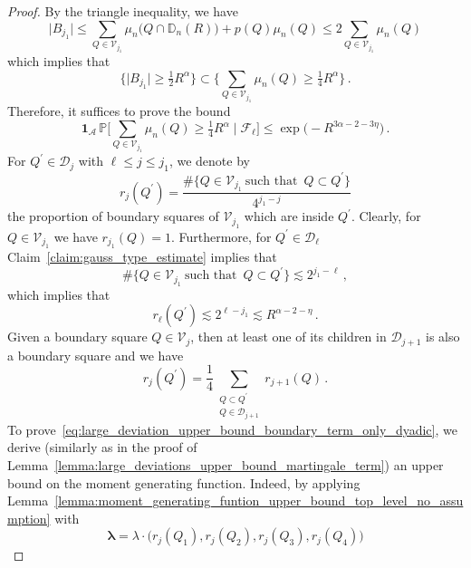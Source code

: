 \documentclass[11pt]{amsart}
\theoremstyle{definition}
\theoremstyle{remark}
\numberwithin{equation}{section}
\def\la{{\lambda}}
\newcommand{\bD}{\mathbb D}
\newcommand{\bP}{\mathbb P}
\begin{document}
	\begin{proof}
		By the triangle inequality, we have
		\[
		\big| B_{j_1} \big| \le \sum_{Q\in \mathcal{V}_{j_1}} \mu_n\big(Q\cap \bD_n(R)\big) + p(Q) \mu_n(Q) \le 2 \sum_{Q\in \mathcal{V}_{j_1}} \mu_n(Q)
		\]
		which implies that 
		\[
		\Big\{\big| B_{j_1} \big| \ge \tfrac{1}{2} R^{\alpha} \Big\} \subset \Big\{\sum_{Q\in \mathcal{V}_{j_1}} \mu_n(Q) \ge \tfrac{1}{4} R^\alpha \Big\} \, .
		\]
		Therefore, it suffices to prove the bound
		\begin{equation}
			\label{eq:large_deviation_upper_bound_boundary_term_only_dyadic}
			\mathbf{1}_{\mathcal{A}} \, \bP\Big[\sum_{Q\in \mathcal{V}_{j_1}} \mu_n(Q) \ge \tfrac{1}{4} R^\alpha \mid \mathcal{F}_\ell\Big] \le \exp\Big(-R^{3\alpha -2 - 3\eta}\Big) \, .
		\end{equation}
		For $Q^\prime\in \mathcal{D}_j$ with $\ell \le j \le j_1$, we denote by
		\begin{equation*}
			r_{j}(Q^\prime) = \frac{\#\big\{Q\in \mathcal{V}_{j_1} \ \text{such that } \, Q\subset Q^\prime\big\}}{4^{j_1-j}}
		\end{equation*}
		the proportion of boundary squares of $\mathcal{V}_{j_1}$ which are inside $Q^\prime$. Clearly, for $Q\in \mathcal{V}_{j_1}$ we have $r_{j_1}(Q) = 1$. Furthermore, for $Q^\prime\in \mathcal{D}_\ell$ Claim~\ref{claim:gauss_type_estimate} implies that
		\[
		\#\big\{Q\in \mathcal{V}_{j_1} \ \text{such that } \, Q\subset Q^\prime\big\} \lesssim 2^{j_1-\ell} \, ,
		\]
		which implies that
		\begin{equation}
			\label{eq:bound_on_r_ell_Q}
			r_{\ell}(Q^\prime) \lesssim 2^{\ell - j_1} \lesssim R^{\alpha-2-\eta} \, .
		\end{equation}
		Given a boundary square $Q\in \mathcal{V}_j$, then at least one of its children in $\mathcal{D}_{j+1}$ is also a boundary square and we have
		\begin{equation}
			\label{eq:average_of_proportions_is_proportion_of_top}
			r_j(Q^\prime) = \frac{1}{4} \sum_{\substack{Q\subset Q^\prime \\ Q\in \mathcal{D}_{j+1}}} r_{j+1}(Q) \, .
		\end{equation} 
		To prove~\eqref{eq:large_deviation_upper_bound_boundary_term_only_dyadic}, we derive (similarly as in the proof of Lemma~\ref{lemma:large_deviations_upper_bound_martingale_term}) an upper bound on the moment generating function. Indeed, by applying Lemma~\ref{lemma:moment_generating_funtion_upper_bound_top_level_no_assumption} with
		\[
		\boldsymbol{\la} = \la \cdot \big(r_{j}(Q_1), r_j(Q_2), r_j(Q_3), r_j(Q_4)\big) 
\]
\end{proof}
\end{document}
